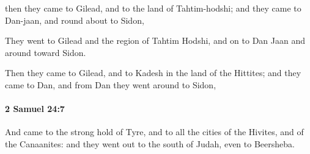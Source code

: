 			\begin{versebox}
					\item[BHS] 
					\item[ASV] then they came to Gilead, and to the land of Tahtim-hodshi; and they came to Dan-jaan, and round about to Sidon,
					\item[NIV] They went to Gilead and the region of Tahtim Hodshi, and on to Dan Jaan and around toward Sidon.
					\item[NRSV] Then they came to Gilead, and to Kadesh in the land of the Hittites; and they came to Dan, and from Dan they went around to Sidon,
			\end{versebox}

		\paragraph{2 Samuel 24:7} %
			\label{2SAMUEL-24-7}

			And came to the strong hold of Tyre, and to all the cities of the Hivites, and of the Canaanites: and they went out to the south of Judah, even to Beersheba.

